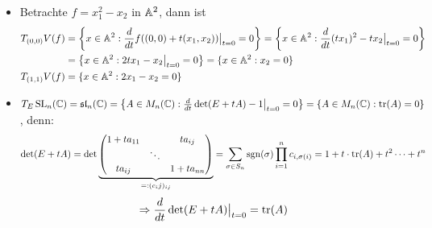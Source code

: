 	\begin{itemize}
		\item Betrachte $f = x_1^2-x_2$ in $\aff^2$, dann ist
		\begin{equation}
		\begin{aligned}
			T_{(0,0)}V(f) &= \penbrace*{x \in \aff^2 : \frac{d}{dt} f( (0,0) + t(x_1,x_2)) \big|_{t=0} = 0 } = \penbrace*{x \in \aff^2 : \frac{d}{dt} (tx_1)^2 - tx_2 \big|_{t=0} = 0} \\
			&= \penbrace*{x \in \aff^2 : 2tx_1 - x_2 \big|_{t=0} = 0} = \{ x \in \aff^2 : x_2 = 0 \} \\
			T_{(1,1)}V(f) &= \{ x \in \aff^2 : 2x_1 - x_2 = 0 \}
		\end{aligned}
		\end{equation}
		\item $T_{E}\SL_n(\CC) = \slie_n(\CC) = \penbrace*{A \in M_n(\CC) : \frac{d}{dt} \det(E + tA) - 1 \big|_{t=0} = 0} = \{A \in M_n(\CC) : \tr(A) = 0 \}$, denn:
		\[ \det(E+tA) = \det \underbrace{\begin{pmatrix}
		1+ta_{11} &  & ta_{ij} \\ 
		& \ddots &  \\ 
		ta_{ij} &  & 1+ta_{nn}
		\end{pmatrix}}_{=:(c_ij)_{ij}} = \sum\limits_{\sigma \in S_n} \sgn(\sigma) \prod\limits_{i=1}^n c_{i,\sigma(i)} = 1 + t \cdot \tr(A) + t^2\dots + t^n \]
		\[ \Rightarrow \frac{d}{dt} \det(E+tA) \big|_{t=0} = \tr(A) \]
	\end{itemize}
\newpage